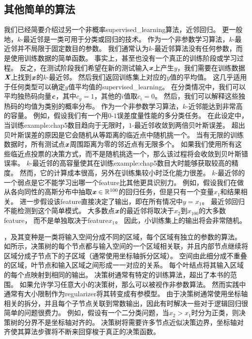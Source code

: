 \subsection{其他简单的算法}
\label{sec:other_simple_supervised_learning_algorithms}
我们已经简要介绍过另一个非概率\gls{supervised_learning}算法，近邻回归。
更一般地，$k$-最近邻是一类可用于分类或回归的技术。
作为一个非参数学习算法，$k$-最近邻并不局限于固定数目的参数。
我们通常认为$k$-最近邻算法没有任何参数，而是使用训练数据的简单函数。
事实上，甚至也没有一个真正的训练阶段或学习过程。
反之，在测试阶段我们希望在新的测试输入$\boldsymbol{\mathit{x}}$上产生$y$，我们需要在训练数据$\boldsymbol{\mathit{X}}$上找到$\boldsymbol{\mathit{x}}$的$k$-最近邻。
然后我们返回训练集上对应的$y$值的平均值。
这几乎适用于任何类型可以确定$y$值平均值的\gls{supervised_learning}。
在分类情况中，我们可以平均独热码向量$\boldsymbol{\mathit{c}}$，其中$c_y = 1$，其他的$i$值取$c_i=0$。
然后，我们可以解释这些独热码的均值为类别的概率分布。
作为一个非参数学习算法，$k$-近邻能达到非常高的容量。
例如，假设我们有一个用$0$-$1$误差度量性能的多分类任务。
在此设定中，当训练\gls{example:chap5}数目趋向于无限时，$1$-最近邻收敛到两倍贝叶斯误差。
超出贝叶斯误差的原因是它会随机从等距离的临近点中随机挑一个。
当有无限的训练数据时，所有测试点$\boldsymbol{\mathit{x}}$周围距离为零的邻近点有无限多个。
如果我们使用所有这些临近点投票的决策方式，而不是随机挑选一个，那么该过程将会收敛到贝叶斯错误率。
$k$-最近邻的高容量使其在训练\gls{example:chap5}数目大时能够获取较高的精度。
然而，它的计算成本很高，另外在训练集较小时泛化能力很差。
$k$-最近邻的一个弱点是它不能学习出哪一个\gls{feature}比其他更具识别力。
例如，假设我们在做从各向同性的高斯分布中抽取$\boldsymbol{\mathit{x}}\in\mathbb{R}^{100}$的回归任务，但是只有一个变量$x_1$和结果相关。
进一步假设该\gls{feature}直接决定了输出，即在所有情况中$y=x_1$。
最近邻回归不能检测到这个简单模式。
大多数点$\boldsymbol{\mathit{x}}$的最近邻将取决于$x_2$到$x_{100}$的大多数\gls{feature}，
而不是单独取决于\gls{feature}$x_1$。
因此，小训练集上的输出将会非常随机。


，及其变种是一类将输入空间分成不同的区域，每个区域有独立的参数的算法\citep{Breiman84}。
如所示，决策树的每个节点都与输入空间的一个区域相关联，并且内部节点继续将区域分成子节点下的子区域（通常使用坐标轴拆分区域）。
空间由此细分成不重叠的区域，叶节点和输入区域之间形成一一对应的关系。
每个叶结点将其输入区域的每个点映射到相同的输出。
决策树通常有特定的训练算法，超出了本书的范围。
如果允许学习任意大小的决策树，那么可以被视作非参数算法。
然而实践中通常有大小限制作为\gls{regularizer}将其转变成有参模型。
由于决策树通常使用坐标轴相关的拆分，并且每个子节点关联到常数输出，因此有时解决一些对于逻辑回归很简单的问题很费力。
例如，假设有一个二分类问题，当$x_2>x_1$时分为正类，则决策树的分界不是坐标轴对齐的。
决策树将需要许多节点近似决策边界，坐标轴对齐使其算法步骤将不断来回穿梭于真正的决策函数。

